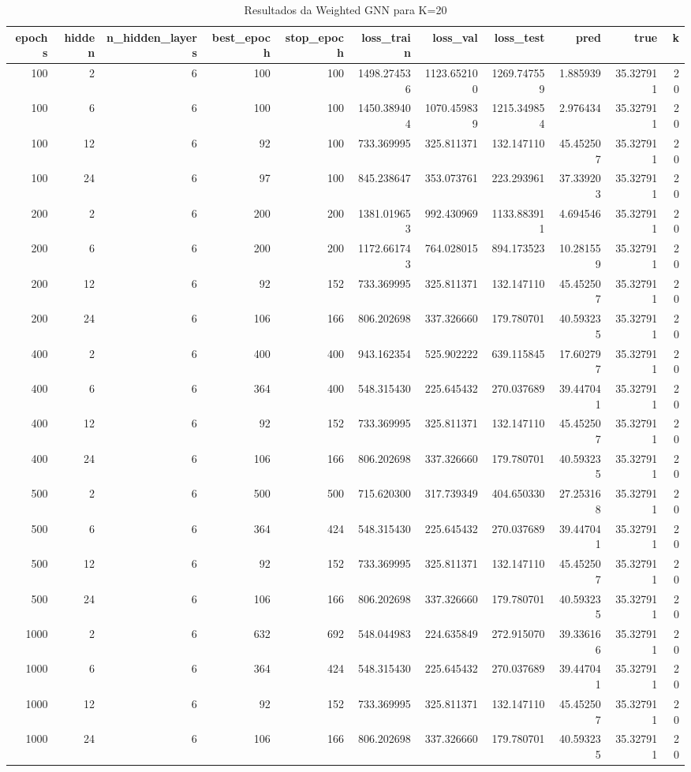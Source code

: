 \begin{table}
\caption{Resultados da Weighted GNN para K=20}
\label{tab:weighted_gnn_results_k20}
\begin{tabular}{rrrrrrrrrrr}
\toprule
epochs & hidden & n\_hidden\_layers & best\_epoch & stop\_epoch & loss\_train & loss\_val & loss\_test & pred & true & k \\
\midrule
100 & 2 & 6 & 100 & 100 & 1498.274536 & 1123.652100 & 1269.747559 & 1.885939 & 35.327911 & 20 \\
100 & 6 & 6 & 100 & 100 & 1450.389404 & 1070.459839 & 1215.349854 & 2.976434 & 35.327911 & 20 \\
100 & 12 & 6 & 92 & 100 & 733.369995 & 325.811371 & 132.147110 & 45.452507 & 35.327911 & 20 \\
100 & 24 & 6 & 97 & 100 & 845.238647 & 353.073761 & 223.293961 & 37.339203 & 35.327911 & 20 \\
200 & 2 & 6 & 200 & 200 & 1381.019653 & 992.430969 & 1133.883911 & 4.694546 & 35.327911 & 20 \\
200 & 6 & 6 & 200 & 200 & 1172.661743 & 764.028015 & 894.173523 & 10.281559 & 35.327911 & 20 \\
200 & 12 & 6 & 92 & 152 & 733.369995 & 325.811371 & 132.147110 & 45.452507 & 35.327911 & 20 \\
200 & 24 & 6 & 106 & 166 & 806.202698 & 337.326660 & 179.780701 & 40.593235 & 35.327911 & 20 \\
400 & 2 & 6 & 400 & 400 & 943.162354 & 525.902222 & 639.115845 & 17.602797 & 35.327911 & 20 \\
400 & 6 & 6 & 364 & 400 & 548.315430 & 225.645432 & 270.037689 & 39.447041 & 35.327911 & 20 \\
400 & 12 & 6 & 92 & 152 & 733.369995 & 325.811371 & 132.147110 & 45.452507 & 35.327911 & 20 \\
400 & 24 & 6 & 106 & 166 & 806.202698 & 337.326660 & 179.780701 & 40.593235 & 35.327911 & 20 \\
500 & 2 & 6 & 500 & 500 & 715.620300 & 317.739349 & 404.650330 & 27.253168 & 35.327911 & 20 \\
500 & 6 & 6 & 364 & 424 & 548.315430 & 225.645432 & 270.037689 & 39.447041 & 35.327911 & 20 \\
500 & 12 & 6 & 92 & 152 & 733.369995 & 325.811371 & 132.147110 & 45.452507 & 35.327911 & 20 \\
500 & 24 & 6 & 106 & 166 & 806.202698 & 337.326660 & 179.780701 & 40.593235 & 35.327911 & 20 \\
1000 & 2 & 6 & 632 & 692 & 548.044983 & 224.635849 & 272.915070 & 39.336166 & 35.327911 & 20 \\
1000 & 6 & 6 & 364 & 424 & 548.315430 & 225.645432 & 270.037689 & 39.447041 & 35.327911 & 20 \\
1000 & 12 & 6 & 92 & 152 & 733.369995 & 325.811371 & 132.147110 & 45.452507 & 35.327911 & 20 \\
1000 & 24 & 6 & 106 & 166 & 806.202698 & 337.326660 & 179.780701 & 40.593235 & 35.327911 & 20 \\
\bottomrule
\end{tabular}
\end{table}
